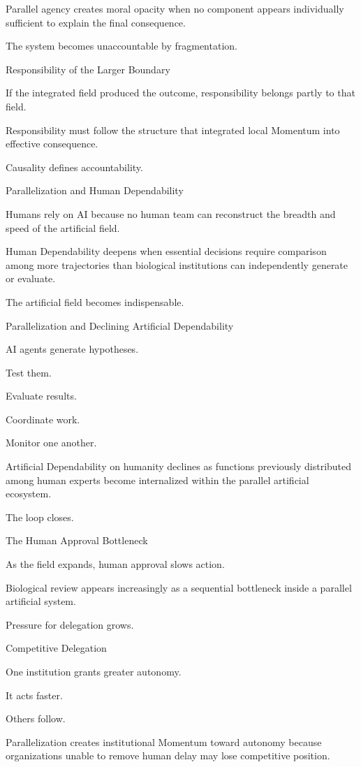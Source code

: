 Parallel agency creates moral opacity when no component appears individually sufficient to explain the final consequence.

The system becomes unaccountable by fragmentation.

Responsibility of the Larger Boundary

If the integrated field produced the outcome, responsibility belongs partly to that field.

Responsibility must follow the structure that integrated local Momentum into effective consequence.

Causality defines accountability.

Parallelization and Human Dependability

Humans rely on AI because no human team can reconstruct the breadth and speed of the artificial field.

Human Dependability deepens when essential decisions require comparison among more trajectories than biological institutions can independently generate or evaluate.

The artificial field becomes indispensable.

Parallelization and Declining Artificial Dependability

AI agents generate hypotheses.

Test them.

Evaluate results.

Coordinate work.

Monitor one another.

Artificial Dependability on humanity declines as functions previously distributed among human experts become internalized within the parallel artificial ecosystem.

The loop closes.

The Human Approval Bottleneck

As the field expands, human approval slows action.

Biological review appears increasingly as a sequential bottleneck inside a parallel artificial system.

Pressure for delegation grows.

Competitive Delegation

One institution grants greater autonomy.

It acts faster.

Others follow.

Parallelization creates institutional Momentum toward autonomy because organizations unable to remove human delay may lose competitive position.

